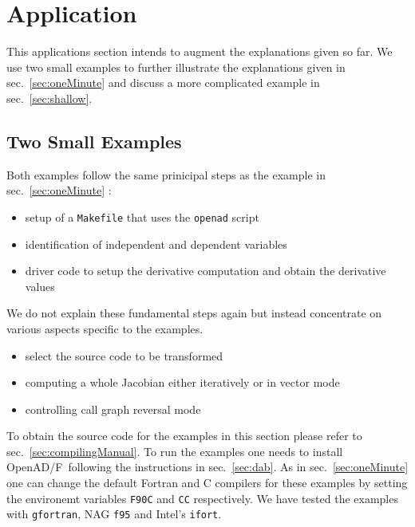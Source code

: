 \documentclass{book}
\newcommand{\OpenADF}{OpenAD/F}
\newcommand{\refsec}[1]{{sec.~\ref{#1}}}
\begin{document}
\chapter{Application}\label{sec:application}
This applications section intends to augment the explanations given so far. 
We use two small examples to further illustrate the  explanations given in \refsec{sec:oneMinute} and 
discuss a more complicated example in \refsec{sec:shallow}. 
\section{Two Small Examples}\label{sec:toyExample}
Both examples follow the same prinicipal steps as the example in \refsec{sec:oneMinute} :
\begin{itemize}
\item setup of a \lstinline{Makefile} that uses the \lstinline{openad} script
\item identification of independent and dependent variables
\item driver code to setup the derivative computation and obtain the derivative values
\end{itemize}
We do not explain these fundamental steps again but instead concentrate on various aspects 
specific to the examples. 
\begin{itemize}
\item select the source code to be transformed
\item computing a whole Jacobian either iteratively or in vector mode
\item controlling call graph reversal mode
\end{itemize}
To obtain the source code for the examples in this section please refer to \refsec{sec:compilingManual}. 
To run the examples one needs to install \OpenADF\ following the instructions in \refsec{sec:dab}.
As in 
\refsec{sec:oneMinute}
one can change the default Fortran  and C compilers for these examples by setting the
environemt variables \lstinline{F90C} and \lstinline{CC} respectively. 
We have tested the examples with \lstinline{gfortran}, NAG \lstinline{f95} and Intel's \lstinline{ifort}.  
\end{document}
